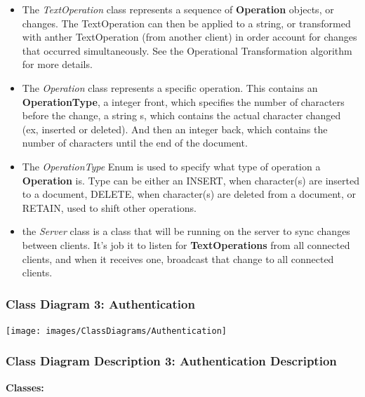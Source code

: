 \documentclass[twoside,letterpaper]{article}
\begin{document}
{\begin{itemize}
\item The \textit{TextOperation} class represents a sequence of \textbf{Operation} objects, or changes. The TextOperation can then be applied to a string, or transformed with anther TextOperation (from another client) in order account for changes that occurred simultaneously. See the Operational Transformation algorithm for more details.
\item The \textit{Operation} class represents a specific operation. This contains an \textbf{OperationType}, a integer front, which specifies the number of characters before the change, a string s, which contains the actual character changed (ex, inserted or deleted). And then an integer back, which contains the number of characters until the end of the document.
\item The \textit{OperationType} Enum is used to specify what type of operation a \textbf{Operation} is. Type can be either an INSERT, when character(s) are inserted to a document, DELETE, when character(s) are deleted from a document, or RETAIN, used to shift other operations.
\item the \textit{Server} class is a class that will be running on the server to sync changes between clients. It's job it to listen for \textbf{TextOperations} from all connected clients, and when it receives one, broadcast that change to all connected clients.
\end{itemize}
\newpage
\subsubsection[Class Diagram 3: Authentication]{\rmfamily\bfseries\color{black}
	Class Diagram 3: Authentication}
\hypertarget{RefHeading22059017292}{}
\bigskip

\texttt{[image: images/ClassDiagrams/Authentication]}

\newpage

\subsubsection[Class Diagram Description 3: Authentication Description]{\rmfamily\bfseries\color{black}
	Class Diagram Description 3: Authentication Description}
\hypertarget{RefHeading22059017292}{}

\textbf{Classes:}
\begin{itemize}


\end{itemize}}
\end{document}
